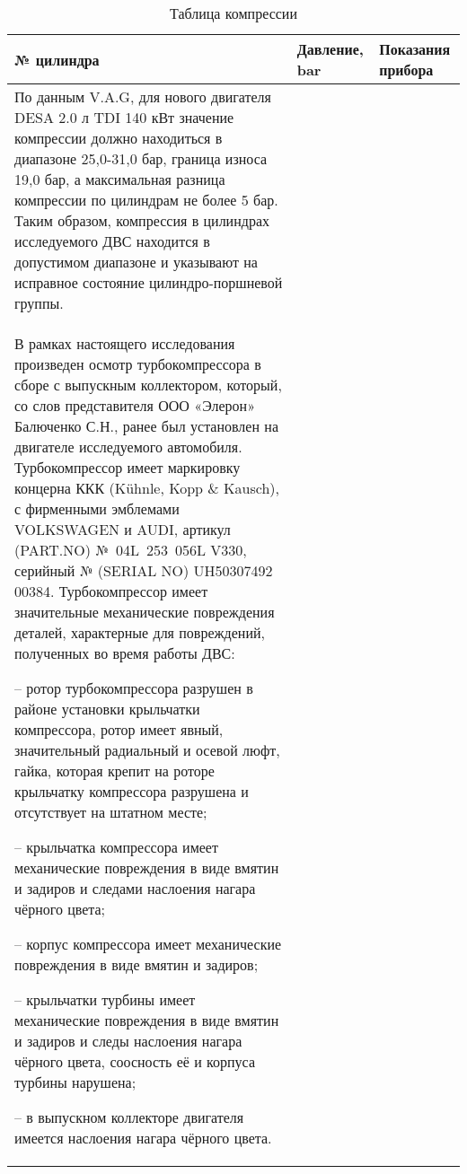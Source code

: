  
 \begin{longtable}{G{25mm}|M{44mm}|G{70mm}}
 	\caption[]{\footnotesize {Таблица компрессии}} 
 	\label{tab:6}\\ 
 	\hline 
 	\hline  \toprule 
 	\bf  {\footnotesize  № цилиндра}  &\bf {\small Давление, bar} & \bf {\small Показания прибора} \\   \hline\hline  \toprule \endhead 
 	
 	
По данным V.A.G, для нового двигателя  DESA 2.0 л TDI 140 кВт  значение компрессии должно находиться в диапазоне 25,0-31,0 бар,  граница износа 19,0 бар, а максимальная разница компрессии по цилиндрам не более 5 бар.  Таким образом, компрессия в цилиндрах исследуемого ДВС находится в допустимом диапазоне и указывают на исправное состояние цилиндро-поршневой группы.\\

В рамках настоящего исследования произведен осмотр турбокомпрессора в сборе с выпускным коллектором, который, со слов представителя ООО «Элерон» Балюченко С.Н., ранее был установлен на двигателе исследуемого автомобиля. Турбокомпрессор имеет маркировку  концерна ККК (Kühnle, Kopp \& Kausch), с фирменными эмблемами VOLKSWAGEN и AUDI, артикул (PART.NO) № 04L 253 056L V330, серийный № (SERIAL NO) UH50307492 00384.  Турбокомпрессор имеет значительные механические повреждения деталей, характерные для повреждений, полученных во время работы ДВС:

-- ротор турбокомпрессора разрушен в районе установки крыльчатки компрессора, ротор имеет явный, значительный радиальный и осевой люфт, гайка, которая крепит на роторе крыльчатку компрессора разрушена и отсутствует на штатном месте;

-- крыльчатка компрессора имеет механические повреждения в виде вмятин и задиров и следами наслоения нагара чёрного цвета;

-- корпус компрессора имеет механические повреждения в виде вмятин и задиров;

-- крыльчатки турбины имеет механические повреждения в виде вмятин и задиров и следы наслоения нагара чёрного цвета, соосность её и корпуса турбины нарушена;

-- в выпускном коллекторе двигателя имеется наслоения нагара чёрного цвета.



\end{longtable}
